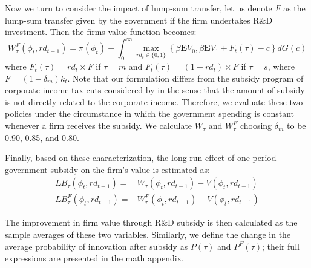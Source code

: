\documentclass[11pt]{article}
\begin{document}
Now we turn to consider the impact of lump-sum transfer, let us denote $F$ as the lump-sum transfer given by the government if the firm undertakes R\&D investment. Then the firms value function becomes:
\begin{equation}\label{wzf}
W_{\tau}^F(\phi_t, rd_{t-1})=\pi(\phi_t)+ \int_0^{\infty}\max_{rd_t\in\{0,1\}}\left\{\beta \mathbf{E}V_{0},  \beta \mathbf{E}V_{1}+F_t(\tau)-c\right\}dG(c)
\end{equation}
where $F_t(\tau)=rd_t\times F$ if $\tau=m$ and $F_t(\tau)=(1-rd_t)\times F$ if $\tau=s$, where $F=(1-\delta_m) k_t$.
Note that our formulation differs from the subsidy program of corporate income tax cuts considered by \citet{Chen2017memo} in the sense that the amount of subsidy is not directly related to the corporate income. Therefore, we evaluate these two policies under the circumstance in which the government spending is constant whenever a firm receives the subsidy. We calculate $W_\tau$ and $W_{\tau}^F$ choosing $\delta_m$ to be 0.90, 0.85, and 0.80.

Finally, based on these characterization, the long-run effect of one-period government subsidy on the firm's value is estimated as:
\begin{align}\label{longsub1}
LB_{\tau}(\phi_t, rd_{t-1})=&W_\tau(\phi_t, rd_{t-1})-V(\phi_t, rd_{t-1}) \\
LB_{\tau}^F(\phi_t, rd_{t-1})=& W_\tau^F(\phi_t, rd_{t-1})-V(\phi_t, rd_{t-1}) \label{BS_zfl} 
\end{align}

The improvement in firm value through R\&D subsidy is then calculated as the sample averages of these two variables. Similarly, we define the change in the average probability of innovation after subsidy as $P(\tau)$ and $P^F(\tau)$; their full expressions are presented in the math appendix.
\end{document}
